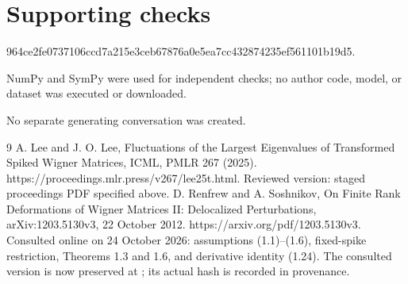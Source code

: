 \documentclass[10pt]{article}
\begin{document}
\section*{Supporting checks}
964ce2fe0737106ccd7a215e3ceb67876a0e5ea7cc432874235ef561101b19d5.\par
NumPy and SymPy were used for independent checks; no author code, model, or dataset was executed or downloaded.\par
No separate generating conversation was created.\par
9 A. Lee and J. O. Lee, Fluctuations of the Largest Eigenvalues of Transformed Spiked Wigner Matrices, ICML, PMLR 267 (2025). https://proceedings.mlr.press/v267/lee25t.html. Reviewed version: staged proceedings PDF specified above. D. Renfrew and A. Soshnikov, On Finite Rank Deformations of Wigner Matrices II: Delocalized Perturbations, arXiv:1203.5130v3, 22 October 2012. https://arxiv.org/pdf/1203.5130v3. Consulted online on 24 October 2026: assumptions (1.1)–(1.6), fixed-spike restriction, Theorems 1.3 and 1.6, and derivative identity (1.24). The consulted version is now preserved at ; its actual hash is recorded in provenance.\par
\end{document}

